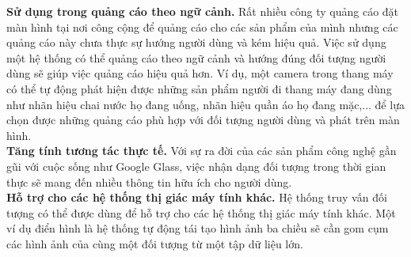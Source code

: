 \textbf{Sử dụng trong quảng cáo theo ngữ cảnh.} Rất nhiều công ty quảng cáo đặt màn hình tại nơi công cộng để quảng cáo cho các sản phẩm của mình nhưng các quảng cáo này chưa thực sự hướng người dùng và kém hiệu quả. Việc sử dụng một hệ thống có thể quảng cáo theo ngữ cảnh và hướng đúng đối tượng người dùng sẽ giúp việc quảng cáo hiệu quả hơn. Ví dụ, một camera trong thang máy có thể tự động phát hiện được những sản phẩm người đi thang máy đang dùng như nhãn hiệu chai nước họ đang uống, nhãn hiệu quần áo họ đang mặc,... để lựa chọn được những quảng cáo phù hợp với đối tượng người dùng và phát trên màn hình.\\
\textbf{Tăng tính tương tác thực tế.} Với sự ra đời của các sản phẩm công nghệ gần gũi với cuộc sống như Google Glass, việc nhận dạng đối tượng trong thời gian thực sẽ mang đến nhiều thông tin hữu ích cho người dùng.\\
\textbf{Hỗ trợ cho các hệ thống thị giác máy tính khác.} Hệ thống truy vấn đối tượng có thể được dùng để hỗ trợ cho các hệ thống thị giác máy tính khác. Một ví dụ điển hình là hệ thống tự động tái tạo hình ảnh ba chiều sẽ cần gom cụm các hình ảnh của cùng một đối tượng từ một tập dữ liệu lớn.\\

